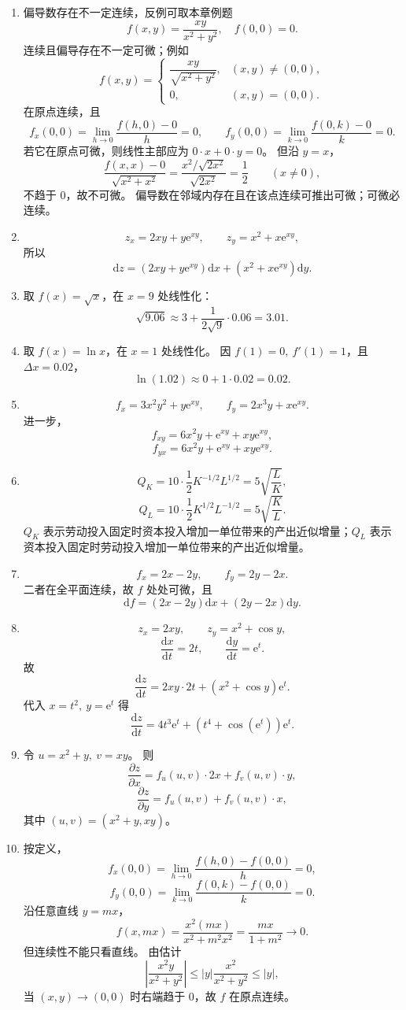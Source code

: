 \documentclass[fontset=fandol]{ctexart}
\newcommand{\dd}{\mathrm{d}}
\newcommand{\ee}{\mathrm{e}}
\begin{document}
\begin{enumerate}[label=\textbf{练习\arabic*.},leftmargin=2.2em]
\item 偏导数存在不一定连续，反例可取本章例题
\[
f(x,y)=\frac{xy}{x^2+y^2},\quad f(0,0)=0.
\]
连续且偏导存在不一定可微；例如
\[
f(x,y)=
\begin{cases}
\dfrac{xy}{\sqrt{x^2+y^2}},&(x,y)\neq(0,0),\\[0.6em]
0,&(x,y)=(0,0).
\end{cases}
\]
在原点连续，且
\[
f_x(0,0)=\lim_{h\to0}\frac{f(h,0)-0}{h}=0,\qquad
f_y(0,0)=\lim_{k\to0}\frac{f(0,k)-0}{k}=0.
\]
若它在原点可微，则线性主部应为 $0\cdot x+0\cdot y=0$。 但沿 $y=x$，
\[
\frac{f(x,x)-0}{\sqrt{x^2+x^2}}
=\frac{x^2/\sqrt{2x^2}}{\sqrt{2x^2}}
=\frac12\qquad(x\neq0),
\]
不趋于 $0$，故不可微。 偏导数在邻域内存在且在该点连续可推出可微；可微必连续。
\item
\[
z_x=2xy+y\ee^{xy},\qquad z_y=x^2+x\ee^{xy},
\]
所以
\[
\dd z=(2xy+y\ee^{xy})\dd x+(x^2+x\ee^{xy})\dd y.
\]
\item 取 $f(x)=\sqrt{x}$，在 $x=9$ 处线性化：
\[
\sqrt{9.06}\approx3+\frac{1}{2\sqrt9}\cdot0.06=3.01.
\]
\item 取 $f(x)=\ln x$，在 $x=1$ 处线性化。 因 $f(1)=0,\ f'(1)=1$，且 $\Delta x=0.02$，
\[
\ln(1.02)\approx0+1\cdot0.02=0.02.
\]
\item
\[
f_x=3x^2y^2+y\ee^{xy},\qquad
f_y=2x^3y+x\ee^{xy}.
\]
进一步，
\[
f_{xy}=6x^2y+\ee^{xy}+xy\ee^{xy},
\]
\[
f_{yx}=6x^2y+\ee^{xy}+xy\ee^{xy}.
\]
\item
\[
Q_K=10\cdot\frac12K^{-1/2}L^{1/2}
=5\sqrt{\frac{L}{K}},
\]
\[
Q_L=10\cdot\frac12K^{1/2}L^{-1/2}
=5\sqrt{\frac{K}{L}}.
\]
$Q_K$ 表示劳动投入固定时资本投入增加一单位带来的产出近似增量；$Q_L$ 表示资本投入固定时劳动投入增加一单位带来的产出近似增量。
\item
\[
f_x=2x-2y,\qquad f_y=2y-2x.
\]
二者在全平面连续，故 $f$ 处处可微，且
\[
\dd f=(2x-2y)\dd x+(2y-2x)\dd y.
\]
\item
\[
z_x=2xy,\qquad z_y=x^2+\cos y,
\]
\[
\frac{\dd x}{\dd t}=2t,\qquad \frac{\dd y}{\dd t}=\ee^t.
\]
故
\[
\frac{\dd z}{\dd t}=2xy\cdot2t+(x^2+\cos y)\ee^t.
\]
代入 $x=t^2,\ y=\ee^t$ 得
\[
\frac{\dd z}{\dd t}=4t^3\ee^t+(t^4+\cos(\ee^t))\ee^t.
\]
\item 令 $u=x^2+y,\ v=xy$。 则
\[
\frac{\partial z}{\partial x}=f_u(u,v)\cdot2x+f_v(u,v)\cdot y,
\]
\[
\frac{\partial z}{\partial y}=f_u(u,v)+f_v(u,v)\cdot x,
\]
其中 $(u,v)=(x^2+y,xy)$。
\item 按定义，
\[
f_x(0,0)=\lim_{h\to0}\frac{f(h,0)-f(0,0)}{h}=0,
\]
\[
f_y(0,0)=\lim_{k\to0}\frac{f(0,k)-f(0,0)}{k}=0.
\]
沿任意直线 $y=mx$，
\[
f(x,mx)=\frac{x^2(mx)}{x^2+m^2x^2}
=\frac{mx}{1+m^2}\to0.
\]
但连续性不能只看直线。 由估计
\[
\left|\frac{x^2y}{x^2+y^2}\right|
\leq |y|\frac{x^2}{x^2+y^2}\leq |y|,
\]
当 $(x,y)\to(0,0)$ 时右端趋于 $0$，故 $f$ 在原点连续。
\end{enumerate}
\end{document}

